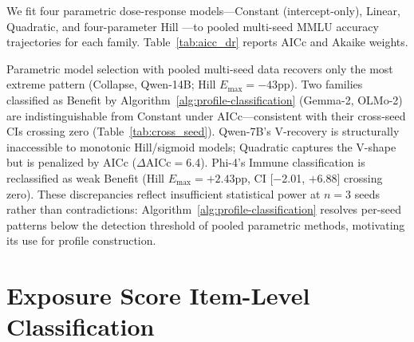 We fit four parametric dose-response models---Constant (intercept-only), Linear, Quadratic, and four-parameter Hill \citep{hill1910aggregation,ritz2015dose}---to pooled multi-seed MMLU accuracy trajectories for each family. Table~\ref{tab:aicc_dr} reports AICc and Akaike weights.

\begin{table}[h]
\centering
\caption{AICc model selection for dose-response trajectories (pooled multi-seed MMLU). Bold indicates best-fitting model per family; $w$ is the Akaike weight of the best model.}
\label{tab:aicc_dr}
\footnotesize
{}
\end{table}

Parametric model selection with pooled multi-seed data recovers only the most extreme pattern (Collapse, Qwen-14B; Hill $E_{\max} = -43$pp). Two families classified as Benefit by Algorithm~\ref{alg:profile-classification} (Gemma-2, OLMo-2) are indistinguishable from Constant under AICc---consistent with their cross-seed CIs crossing zero (Table~\ref{tab:cross_seed}). Qwen-7B's V-recovery is structurally inaccessible to monotonic Hill/sigmoid models; Quadratic captures the V-shape but is penalized by AICc ($\Delta$AICc$=$6.4). Phi-4's Immune classification is reclassified as weak Benefit (Hill $E_{\max} = +2.43$pp, CI [$-$2.01, $+$6.88] crossing zero). These discrepancies reflect insufficient statistical power at $n\!=\!3$ seeds rather than contradictions: Algorithm~\ref{alg:profile-classification} resolves per-seed patterns below the detection threshold of pooled parametric methods, motivating its use for profile construction.

\section{Exposure Score Item-Level Classification}
\label{sec:sij_classification}

